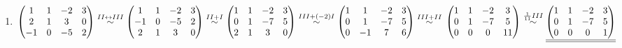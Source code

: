 \documentclass{article}
\newcommand{\uu}[1]{\underline{\underline{#1}}}
\newcommand{\eqto}[1]{\overset{#1}{\sim}}
\begin{document}
\begin{enumerate}[A=]
\vspace{3em}

    \item \(
    \begin{pmatrix}
        1&1&-2&3\\2&1&3&0\\-1&0&-5&2
    \end{pmatrix}
    \eqto{II\leftrightarrow III}
    \begin{pmatrix}
        1 & 1 & -2&3\\-1&0&-5&2\\2&1&3&0
    \end{pmatrix}
    \eqto{II+I}
    \begin{pmatrix}
        1&1&-2&3\\0&1&-7&5\\2&1&3&0
    \end{pmatrix}
    \eqto{III+(-2)I}
    \begin{pmatrix}
        1&1&-2&3\\0&1&-7&5\\0&-1&7&6
    \end{pmatrix}
    \eqto{III+II} \\ \\
    \begin{pmatrix}
        1&1&-2&3\\0&1&-7&5\\0&0&0&11
    \end{pmatrix}
    \eqto{\frac{1}{11}III}
    \uu{\begin{pmatrix}
        1&1&-2&3\\0&1&-7&5\\0&0&0&1
    \end{pmatrix}}
    \)

\vspace{3em}


\end{enumerate}
\end{document}
